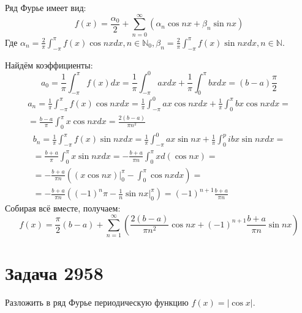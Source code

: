 \documentclass[11pt]{article}
\begin{document}
Ряд Фурье имеет вид:
$$f(x) = \frac{\alpha_0}2 + \sum_{n = 0}^\infty(\alpha_n\cos nx + \beta_n\sin nx)$$
Где \(\alpha_n = \frac{2}\pi\int_{-\pi}^\pi f(x)\cos nxdx, n \in \mathbb{N}_0,
\beta_n = \frac{2}\pi\int_{-\pi}^\pi f(x)\sin nxdx, n \in \mathbb{N}\).

Найдём коэффициенты:
$$a_0 = \frac{1}\pi\int_{-\pi}^\pi f(x)dx = \frac{1}\pi\int_{-\pi}^0 axdx + \frac{1}\pi\int_0^\pi bxdx = (b - a)\frac{\pi}2$$
\begin{multline*}
a_n = \frac{1}\pi\int_{-\pi}^\pi f(x)\cos nx dx = \frac{1}\pi\int_{-\pi}^0 ax\cos nxdx + \frac{1}\pi\int_0^\pi bx\cos nxdx = \\
 = \frac{b - a}\pi\int_0^\pi x\cos nx dx = \frac{2(b - a)}{\pi n^2}
\end{multline*}
\begin{multline*}
b_n = \frac{1}\pi\int_{-\pi}^\pi f(x)\sin nx dx = \frac{1}\pi\int_{-\pi}^0 ax\sin nx + \frac{1}\pi\int_0^pi bx\sin nx dx = \\
 = \frac{b + a}\pi\int_0^\pi x\sin nx dx = -\frac{b + a}{\pi n}\int_0^\pi xd(\cos nx) = \\
 = -\frac{b + a}{\pi n}\left((x\cos nx)\bigg|_0^\pi - \int_0^\pi\cos nxdx\right) = \\
 = -\frac{b+a}{\pi n}\left((-1)^n\pi - \frac{1}n\sin nx\bigg|_0^\pi\right) = (-1)^{n+1}\frac{b+a}{\pi n}
\end{multline*}
Собирая всё вместе, получаем:
$$f(x) = \frac{\pi}2(b - a) + \sum_{n = 1}^\infty\left(\frac{2(b - a)}{\pi n^2}\cos nx + (-1)^{n + 1}\frac{b+a}{\pi n}\sin nx\right)$$
\section{Задача 2958}
\label{sec:org3276002}
Разложить в ряд Фурье периодическую функцию \(f(x) = |\cos x|\).
\end{document}
